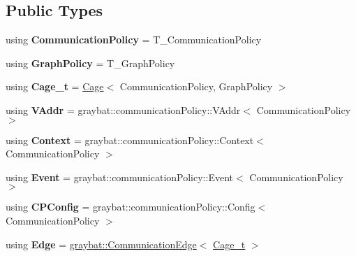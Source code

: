 \subsection*{Public Types}
\begin{DoxyCompactItemize}
\item 
\hypertarget{structgraybat_1_1Cage_a848caea3a16ff2390c8b0020cef298f2}{}using {\bfseries Communication\+Policy} = T\+\_\+\+Communication\+Policy\label{structgraybat_1_1Cage_a848caea3a16ff2390c8b0020cef298f2}

\item 
\hypertarget{structgraybat_1_1Cage_afc98171db17598bd0030d90ff101e4c2}{}using {\bfseries Graph\+Policy} = T\+\_\+\+Graph\+Policy\label{structgraybat_1_1Cage_afc98171db17598bd0030d90ff101e4c2}

\item 
\hypertarget{structgraybat_1_1Cage_ac7de84bd47f0af51bf87051355424ce9}{}using {\bfseries Cage\+\_\+t} = \hyperlink{structgraybat_1_1Cage}{Cage}$<$ Communication\+Policy, Graph\+Policy $>$\label{structgraybat_1_1Cage_ac7de84bd47f0af51bf87051355424ce9}

\item 
\hypertarget{structgraybat_1_1Cage_a5fcd15bbd715221a9d05f2fa5f2d14d5}{}using {\bfseries V\+Addr} = graybat\+::communication\+Policy\+::\+V\+Addr$<$ Communication\+Policy $>$\label{structgraybat_1_1Cage_a5fcd15bbd715221a9d05f2fa5f2d14d5}

\item 
\hypertarget{structgraybat_1_1Cage_a716c512829be5cca5dcbf2a52754d10d}{}using {\bfseries Context} = graybat\+::communication\+Policy\+::\+Context$<$ Communication\+Policy $>$\label{structgraybat_1_1Cage_a716c512829be5cca5dcbf2a52754d10d}

\item 
\hypertarget{structgraybat_1_1Cage_af23858450f27e9dfde241521a13df525}{}using {\bfseries Event} = graybat\+::communication\+Policy\+::\+Event$<$ Communication\+Policy $>$\label{structgraybat_1_1Cage_af23858450f27e9dfde241521a13df525}

\item 
\hypertarget{structgraybat_1_1Cage_a425d340120d20ee287043cbaa3e66d27}{}using {\bfseries C\+P\+Config} = graybat\+::communication\+Policy\+::\+Config$<$ Communication\+Policy $>$\label{structgraybat_1_1Cage_a425d340120d20ee287043cbaa3e66d27}

\item 
\hypertarget{structgraybat_1_1Cage_a1c8a9c50bfa2ac05eb0e36acf2c4f791}{}using {\bfseries Edge} = \hyperlink{structgraybat_1_1CommunicationEdge}{graybat\+::\+Communication\+Edge}$<$ \hyperlink{structgraybat_1_1Cage}{Cage\+\_\+t} $>$\label{structgraybat_1_1Cage_a1c8a9c50bfa2ac05eb0e36acf2c4f791}


\end{DoxyCompactItemize}
